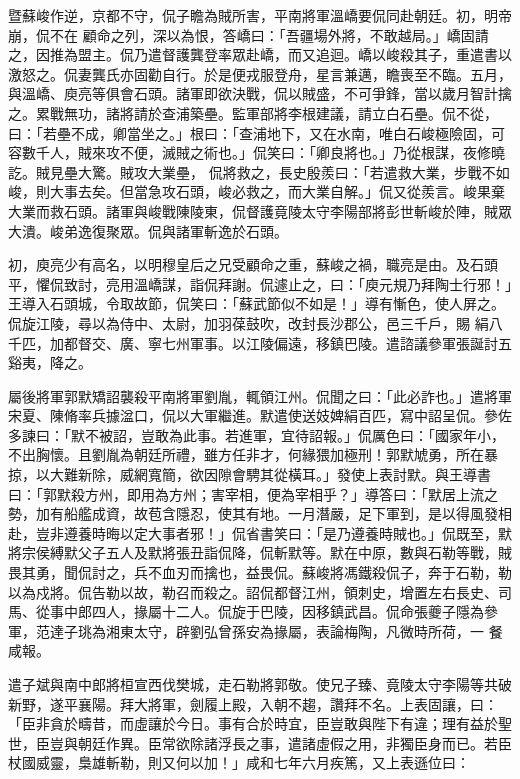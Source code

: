 \begin{pinyinscope}
 暨蘇峻作逆，京都不守，侃子瞻為賊所害，平南將軍溫嶠要侃同赴朝廷。初，明帝崩，侃不在
 顧命之列，深以為恨，答嶠曰：「吾疆場外將，不敢越局。」嶠固請之，因推為盟主。侃乃遣督護龔登率眾赴嶠，而又追迴。嶠以峻殺其子，重遣書以激怒之。侃妻龔氏亦固勸自行。於是便戎服登舟，星言兼邁，瞻喪至不臨。五月，與溫嶠、庾亮等俱會石頭。諸軍即欲決戰，侃以賊盛，不可爭鋒，當以歲月智計擒之。累戰無功，諸將請於查浦築壘。監軍部將李根建議，請立白石壘。侃不從，曰：「若壘不成，卿當坐之。」根曰：「查浦地下，又在水南，唯白石峻極險固，可容數千人，賊來攻不便，滅賊之術也。」侃笑曰：「卿良將也。」乃從根謀，夜修曉訖。賊見壘大驚。賊攻大業壘，
 侃將救之，長史殷羨曰：「若遣救大業，步戰不如峻，則大事去矣。但當急攻石頭，峻必救之，而大業自解。」侃又從羨言。峻果棄大業而救石頭。諸軍與峻戰陳陵東，侃督護竟陵太守李陽部將彭世斬峻於陣，賊眾大潰。峻弟逸復聚眾。侃與諸軍斬逸於石頭。



 初，庾亮少有高名，以明穆皇后之兄受顧命之重，蘇峻之禍，職亮是由。及石頭平，懼侃致討，亮用溫嶠謀，詣侃拜謝。侃遽止之，曰：「庾元規乃拜陶士行邪！」王導入石頭城，令取故節，侃笑曰：「蘇武節似不如是！」導有慚色，使人屏之。侃旋江陵，尋以為侍中、太尉，加羽葆鼓吹，改封長沙郡公，邑三千戶，賜
 絹八千匹，加都督交、廣、寧七州軍事。以江陵偏遠，移鎮巴陵。遣諮議參軍張誕討五谿夷，降之。



 屬後將軍郭默矯詔襲殺平南將軍劉胤，輒領江州。侃聞之曰：「此必詐也。」遣將軍宋夏、陳脩率兵據湓口，侃以大軍繼進。默遣使送妓婢絹百匹，寫中詔呈侃。參佐多諫曰：「默不被詔，豈敢為此事。若進軍，宜待詔報。」侃厲色曰：「國家年小，不出胸懷。且劉胤為朝廷所禮，雖方任非才，何緣猥加極刑！郭默虓勇，所在暴掠，以大難新除，威網寬簡，欲因隙會騁其從橫耳。」發使上表討默。與王導書曰：「郭默殺方州，即用為方州；害宰相，便為宰相乎？」導答曰：「默居上流之
 勢，加有船艦成資，故苞含隱忍，使其有地。一月潛嚴，足下軍到，是以得風發相赴，豈非遵養時晦以定大事者邪！」侃省書笑曰：「是乃遵養時賊也。」侃既至，默將宗侯縛默父子五人及默將張丑詣侃降，侃斬默等。默在中原，數與石勒等戰，賊畏其勇，聞侃討之，兵不血刃而擒也，益畏侃。蘇峻將馮鐵殺侃子，奔于石勒，勒以為戍將。侃告勒以故，勒召而殺之。詔侃都督江州，領刺史，增置左右長史、司馬、從事中郎四人，掾屬十二人。侃旋于巴陵，因移鎮武昌。侃命張夔子隱為參軍，范達子珧為湘東太守，辟劉弘曾孫安為掾屬，表論梅陶，凡微時所荷，一
 餐咸報。



 遣子斌與南中郎將桓宣西伐樊城，走石勒將郭敬。使兄子臻、竟陵太守李陽等共破新野，遂平襄陽。拜大將軍，劍履上殿，入朝不趨，讚拜不名。上表固讓，曰：「臣非貪於疇昔，而虛讓於今日。事有合於時宜，臣豈敢與陛下有違；理有益於聖世，臣豈與朝廷作異。臣常欲除諸浮長之事，遣諸虛假之用，非獨臣身而已。若臣杖國威靈，梟雄斬勒，則又何以加！」咸和七年六月疾篤，又上表遜位曰：




\end{pinyinscope}
